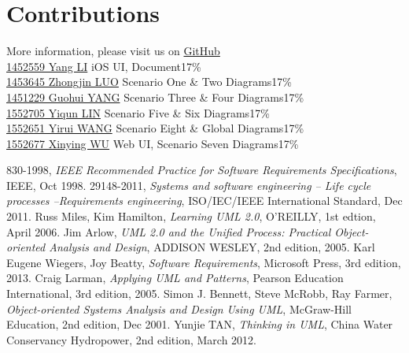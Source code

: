 \documentclass[12pt]{scrreprt}
\begin{document}
\chapter{Contributions}
More information, please visit us on \href{https://github.com/zjzsliyang/OnionExpress}{GitHub}
\vspace{3mm}\\
\href{https://github.com/zjzsliyang}{{\color{blue}1452559 Yang LI}} \hspace{17mm} iOS UI, Document\hfill 17\%\\
\href{https://github.com/tjluozhongjin}{{\color{blue}1453645 Zhongjin LUO}} \hspace{5mm} Scenario One \& Two Diagrams\hfill 17\%\\
\href{https://github.com/Yghifi}{{\color{blue}1451229 Guohui YANG}} \hspace{4.5mm} Scenario Three \& Four Diagrams\hfill 17\%\\
\href{https://github.com/lyqun}{{\color{blue}1552705 Yiqun LIN}} \hspace{11mm} Scenario Five \& Six Diagrams\hfill 17\%\\
\href{https://github.com/Charon0622}{{\color{blue}1552651 Yirui WANG}} \hspace{7mm} Scenario Eight \& Global Diagrams\hfill 17\%\\
\href{https://github.com/CandiceGemini}{{\color{blue}1552677 Xinying WU}} \hspace{8mm} Web UI, Scenario Seven Diagrams\hfill 17\%

\begin{thebibliography}{99}
  830-1998,
  \emph{IEEE Recommended Practice for Software Requirements Specifications},
  IEEE,
  Oct 1998.
  29148-2011,
  \emph{Systems and software engineering -- Life cycle processes --Requirements engineering},
  ISO/IEC/IEEE International Standard,
  Dec 2011.
  Russ Miles, Kim Hamilton,
  \emph{Learning UML 2.0},
  O'REILLY,
  1st edtion,
  April 2006.
  Jim Arlow,
  \emph{UML 2.0 and the Unified Process: Practical Object-oriented Analysis and Design},
  ADDISON WESLEY,
  2nd edition,
  2005.
  Karl Eugene Wiegers, Joy Beatty,
  \emph{Software Requirements},
  Microsoft Press,
  3rd edition,
  2013.
  Craig Larman,
  \emph{Applying UML and Patterns},
  Pearson Education International,
  3rd edition,
  2005.
  Simon J. Bennett, Steve McRobb, Ray Farmer,
  \emph{Object-oriented Systems Analysis and Design Using UML},
  McGraw-Hill Education,
  2nd edition,
  Dec 2001.
  Yunjie TAN,
  \emph{Thinking in UML},
  China Water Conservancy Hydropower,
  2nd edition,
  March 2012.
\end{thebibliography}
\end{document}
